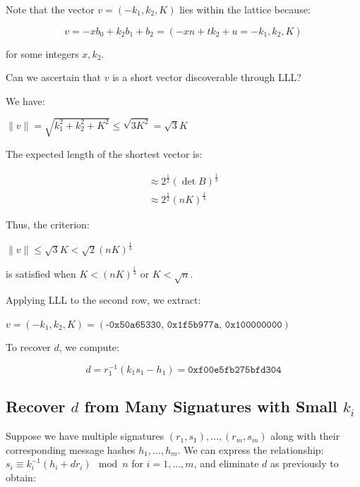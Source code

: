 \documentclass[a4paper,12pt]{report}
\begin{document}
Note that the vector $v = (-k_1, k_2, K)$ lies within the lattice because:

\[
    v = -xb_0 + k_2b_1 + b_2 = (-xn + tk_2 + u = -k_1, k_2, K)
\]

for some integers $x, k_2$.

\vspace*{10px}

Can we ascertain that $v$ is a short vector discoverable through LLL?

We have:

\begin{center}
    $\lVert v \rVert = \sqrt{k_1^2 + k_2^2 + K^2} \le \sqrt{3K^2} = \sqrt{3}K $
\end{center}

The expected length of the shortest vector is:

\[
    \begin{array}{c}
        \approx 2^{\frac{1}{2}}(\det B)^{\frac{1}{3}} \\
        \approx 2^{\frac{1}{2}}(nK)^{\frac{1}{3}}
    \end{array}
\]

Thus, the criterion:

\begin{center}
    $\lVert v \rVert \le \sqrt{3}K < \sqrt{2}(nK)^{\frac{1}{3}}$
\end{center}

is satisfied when $K < (nK)^{\frac{1}{3}}$ or $K < \sqrt{n}$.

Applying LLL to the second row, we extract:

\begin{center}
    $v = (-k_1, k_2, K) = (\texttt{-0x50a65330, 0x1f5b977a, 0x100000000})$
\end{center}

To recover $d$, we compute:

\[
    d = r_1^{-1}(k_1s_1 - h_1) = \texttt{0xf00e5fb275bfd304}
\]

\subsection{Recover $d$ from Many Signatures with Small $k_i$}

Suppose we have multiple signatures $(r_1, s_1), \ldots, (r_m, s_m)$ along with their corresponding message hashes $h_1, \ldots, h_m$. We can express the relationship:
$s_i \equiv k_i^{-1}(h_i +  dr_i) \mod n$ for $i = 1,\ldots,m$, and eliminate $d$ as previously to obtain:
\end{document}
